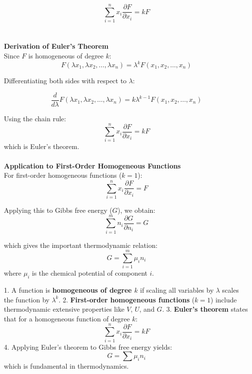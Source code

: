 \documentclass{article}
\theoremstyle{definition}
\begin{document}
\begin{mdframed}[style=MyFrame, frametitle={Definition of Homogeneous Functions}]
\begin{equation}
    \sum_{i=1}^{n} x_i \frac{\partial F}{\partial x_i} = k F
\end{equation}
\\
\\

\textbf{Derivation of Euler’s Theorem}
\\
Since $F$ is homogeneous of degree $k$:
\begin{equation}
    F(\lambda x_1, \lambda x_2, \dots, \lambda x_n) = \lambda^k F(x_1, x_2, \dots, x_n)
\end{equation}

Differentiating both sides with respect to $\lambda$:

\begin{equation}
    \frac{d}{d\lambda} F(\lambda x_1, \lambda x_2, \dots, \lambda x_n) = k \lambda^{k-1} F(x_1, x_2, \dots, x_n)
\end{equation}

Using the chain rule:
\begin{equation}
    \sum_{i=1}^{n} x_i \frac{\partial F}{\partial x_i} = k F
\end{equation}
which is Euler’s theorem.
\\
\\

\textbf{Application to First-Order Homogeneous Functions}
\\
For first-order homogeneous functions ($k = 1$):
\begin{equation}
    \sum_{i=1}^{n} x_i \frac{\partial F}{\partial x_i} = F
\end{equation}

Applying this to Gibbs free energy ($G$), we obtain:
\begin{equation}
    \sum_{i=1}^{m} n_i \frac{\partial G}{\partial n_i} = G
\end{equation}

which gives the important thermodynamic relation:
\begin{equation}
    G = \sum_{i=1}^{m} \mu_i n_i
\end{equation}
where $\mu_i$ is the chemical potential of component $i$.


1. A function is \textbf{homogeneous of degree $k$} if scaling all variables by $\lambda$ scales the function by $\lambda^k$.
2. \textbf{First-order homogeneous functions} ($k=1$) include thermodynamic extensive properties like $V$, $U$, and $G$.
3. \textbf{Euler’s theorem} states that for a homogeneous function of degree $k$:
   \begin{equation}
       \sum_{i=1}^{n} x_i \frac{\partial F}{\partial x_i} = k F
   \end{equation}
4. Applying Euler’s theorem to Gibbs free energy yields:
   \begin{equation}
       G = \sum \mu_i n_i
   \end{equation}
   which is fundamental in thermodynamics.

\end{mdframed}
\end{document}
